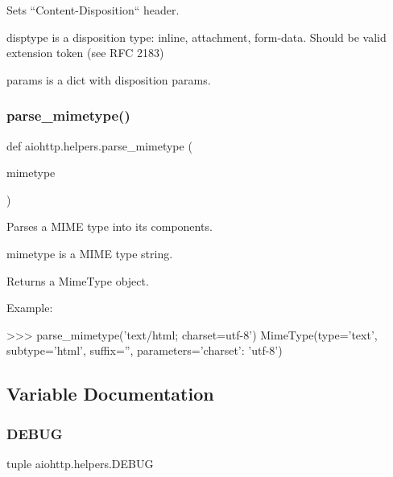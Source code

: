 \begin{DoxyVerb}Sets ``Content-Disposition`` header.

disptype is a disposition type: inline, attachment, form-data.
Should be valid extension token (see RFC 2183)

params is a dict with disposition params.
\end{DoxyVerb}
 \mbox{\label{namespaceaiohttp_1_1helpers_ae8dd5cf366965adb5c86e71db1df9369}} 
\subsubsection{\texorpdfstring{parse\+\_\+mimetype()}{parse\_mimetype()}}
{\footnotesize\ttfamily def aiohttp.\+helpers.\+parse\+\_\+mimetype (\begin{DoxyParamCaption}\item[{}]{mimetype }\end{DoxyParamCaption})}

\begin{DoxyVerb}Parses a MIME type into its components.

mimetype is a MIME type string.

Returns a MimeType object.

Example:

>>> parse_mimetype('text/html; charset=utf-8')
MimeType(type='text', subtype='html', suffix='',
         parameters={'charset': 'utf-8'})\end{DoxyVerb}
 

\subsection{Variable Documentation}
\mbox{\label{namespaceaiohttp_1_1helpers_a3edcc66bf33f872351be76af0ea33298}} 
\subsubsection{\texorpdfstring{D\+E\+B\+UG}{DEBUG}}
{\footnotesize\ttfamily tuple aiohttp.\+helpers.\+D\+E\+B\+UG}

